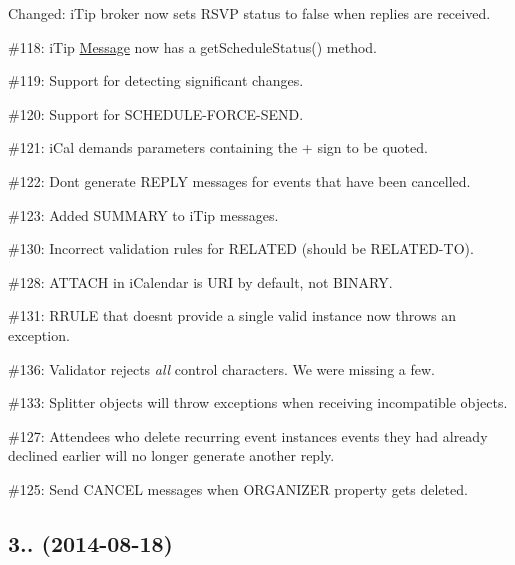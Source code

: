 \begin{DoxyItemize}
\item Changed\+: i\+Tip broker now sets R\+S\+VP status to false when replies are received.
\item \#118\+: i\+Tip \mbox{\hyperlink{class_message}{Message}} now has a {\ttfamily get\+Schedule\+Status()} method.
\item \#119\+: Support for detecting \textquotesingle{}significant changes\textquotesingle{}.
\item \#120\+: Support for {\ttfamily S\+C\+H\+E\+D\+U\+L\+E-\/\+F\+O\+R\+C\+E-\/\+S\+E\+ND}.
\item \#121\+: i\+Cal demands parameters containing the + sign to be quoted.
\item \#122\+: Don\textquotesingle{}t generate R\+E\+P\+LY messages for events that have been cancelled.
\item \#123\+: Added {\ttfamily S\+U\+M\+M\+A\+RY} to i\+Tip messages.
\item \#130\+: Incorrect validation rules for {\ttfamily R\+E\+L\+A\+T\+ED} (should be {\ttfamily R\+E\+L\+A\+T\+E\+D-\/\+TO}).
\item \#128\+: {\ttfamily A\+T\+T\+A\+CH} in i\+Calendar is {\ttfamily U\+RI} by default, not {\ttfamily B\+I\+N\+A\+RY}.
\item \#131\+: R\+R\+U\+LE that doesn\textquotesingle{}t provide a single valid instance now throws an exception.
\item \#136\+: Validator rejects {\itshape all} control characters. We were missing a few.
\item \#133\+: Splitter objects will throw exceptions when receiving incompatible objects.
\item \#127\+: Attendees who delete recurring event instances events they had already declined earlier will no longer generate another reply.
\item \#125\+: Send C\+A\+N\+C\+EL messages when O\+R\+G\+A\+N\+I\+Z\+ER property gets deleted.
\end{DoxyItemize}

\subsection*{3.. (2014-\/08-\/18) }


